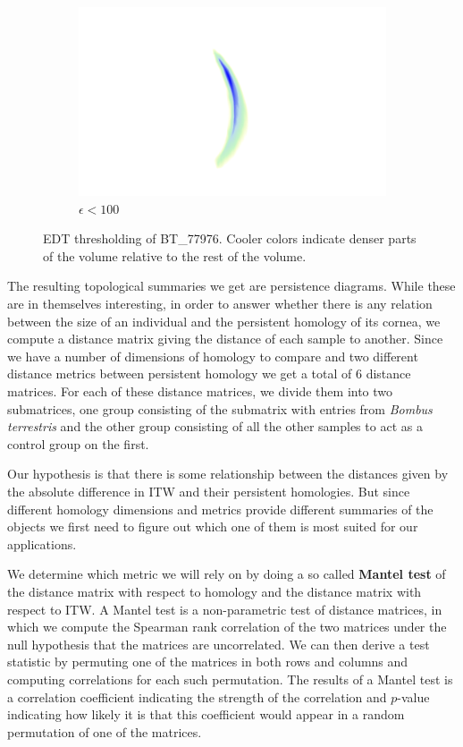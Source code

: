 \begin{figure}[ht]
\begin{subfigure}{.3 \linewidth}
  \includegraphics[scale=0.2]{eps100.png}
  \caption{$\epsilon < 100$}
  \end{subfigure}
  \caption{\label{thresh} EDT thresholding of BT\_77976. Cooler colors indicate denser parts of the volume relative to the rest of the volume.}
\end{figure}

The resulting topological summaries we get are persistence diagrams. While these are in themselves interesting, in order to answer whether there is any relation between the size of an individual and the persistent homology of its cornea, we compute a distance matrix giving the distance of each sample to another. Since we have a number of dimensions of homology to compare and two different distance metrics between persistent homology we get a total of 6 distance matrices. For each of these distance matrices, we divide them into two submatrices, one group consisting of the submatrix with entries from \textit{Bombus terrestris} and the other group consisting of all the other samples to act as a control group on the first.

Our hypothesis is that there is some relationship between the distances given by the absolute difference in ITW and their persistent homologies. But since different homology dimensions and metrics provide different summaries of the objects we first need to figure out which one of them is most suited for our applications.

We determine which metric we will rely on by doing a so called \textbf{Mantel test} \cite[p. ~813]{mantel} of the distance matrix with respect to homology and the distance matrix with respect to ITW. A Mantel test is a non-parametric test of distance matrices, in which we compute the Spearman rank correlation of the two matrices under the null hypothesis that the matrices are uncorrelated. We can then derive a test statistic by permuting one of the matrices in both rows and columns and computing correlations for each such permutation.  The results of a Mantel test is a correlation coefficient indicating the strength of the correlation and $p$-value indicating how likely it is  that this coefficient would appear in a random permutation of one of the matrices.

